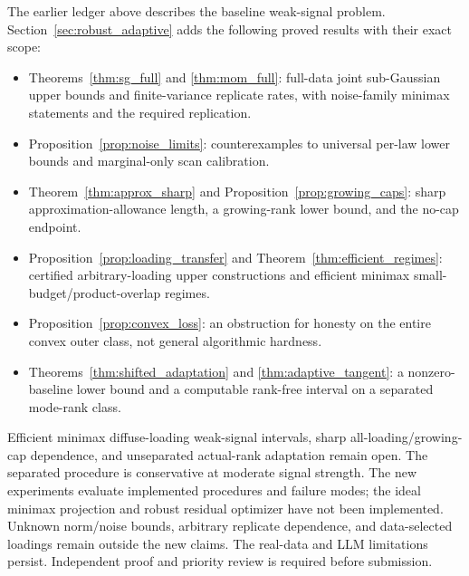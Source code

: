 The earlier ledger above describes the baseline weak-signal problem. Section~\ref{sec:robust_adaptive} adds the following proved results with their exact scope:
\begin{itemize}
\item Theorems~\ref{thm:sg_full} and \ref{thm:mom_full}: full-data joint sub-Gaussian upper bounds and finite-variance replicate rates, with noise-family minimax statements and the required replication.
\item Proposition~\ref{prop:noise_limits}: counterexamples to universal per-law lower bounds and marginal-only scan calibration.
\item Theorem~\ref{thm:approx_sharp} and Proposition~\ref{prop:growing_caps}: sharp approximation-allowance length, a growing-rank lower bound, and the no-cap endpoint.
\item Proposition~\ref{prop:loading_transfer} and Theorem~\ref{thm:efficient_regimes}: certified arbitrary-loading upper constructions and efficient minimax small-budget/product-overlap regimes.
\item Proposition~\ref{prop:convex_loss}: an obstruction for honesty on the entire convex outer class, not general algorithmic hardness.
\item Theorems~\ref{thm:shifted_adaptation} and \ref{thm:adaptive_tangent}: a nonzero-baseline lower bound and a computable rank-free interval on a separated mode-rank class.
\end{itemize}

Efficient minimax diffuse-loading weak-signal intervals, sharp all-loading/growing-cap dependence, and unseparated actual-rank adaptation remain open. The separated procedure is conservative at moderate signal strength. The new experiments evaluate implemented procedures and failure modes; the ideal minimax projection and robust residual optimizer have not been implemented. Unknown norm/noise bounds, arbitrary replicate dependence, and data-selected loadings remain outside the new claims. The real-data and LLM limitations persist. Independent proof and priority review is required before submission.
